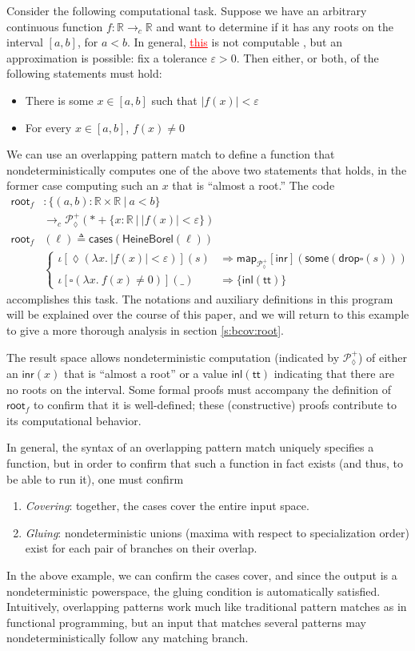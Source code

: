\documentclass[conference]{IEEEtran}
\newcommand{\PLower}{\mathcal{P}_\lozenge}
\newcommand{\cto}{\to_c}
\newcommand{\R}{\mathbb{R}}
\newcommand{\map}[2]{\mathsf{map}_{#1}[{#2}]}
\newcommand{\fun}[2]{\lambda {#1}.\  {#2}}
\newcommand{\suchthat}{\ |\ }
\newcommand{\One}{\ast}
\newcommand{\wildcard}{\_}
\newcommand{\oinclf}[1]{\iota[{#1}]}
\newcommand{\oincl}[2]{\oinclf{#1} \left({#2}\right)}
\newcommand{\Branch}{\Rightarrow}
\newcommand{\RootFindingCode}{
\mathsf{root}_f &: \{ (a, b) : \R \times \R \suchthat a < b \}
  \\ &\cto \PLower^+(\One + \{ x : \R \suchthat |f(x)| < \varepsilon \})
\\ \mathsf{root}_f&(\ell) \triangleq \mathsf{cases}(\mathsf{HeineBorel}(\ell))
\\ &\begin{cases}
\oincl{\lozenge (\fun{x}{|f(x)| < \varepsilon})}{s} 
  &\Branch \map{\PLower^+}{\mathsf{inr}}(\mathsf{some}(\mathsf{drop}\square(s)))
\\ \oincl{\square (\fun{x}{f(x) \neq 0})}{\wildcard}
  &\Branch \{ \mathsf{inl}(\mathsf{tt}) \}
\end{cases}
}
\newcommand{\grammar}[1]{\textcolor{red}{\underline{#1}}}
\begin{document}
Consider the following computational task. Suppose we have an arbitrary continuous function $f : \R \cto \R$ and want to determine if it has any roots on the interval $[a,b]$, for $a < b$. In general, \grammar{this} is not computable \cite{lamcra}, but an approximation is possible: fix a tolerance $\varepsilon > 0$. Then either, or both, of the following statements must hold:
\begin{itemize}
\item There is some $x \in [a, b]$ such that $|f(x)| < \varepsilon$
\item For every $x \in [a, b]$, $f(x) \neq 0$
\end{itemize}
We can use an overlapping pattern match to define a function that nondeterministically computes one of the above two statements that holds, in the former case computing such an $x$ that is ``almost a root.'' The code
\begin{align*}
\RootFindingCode
\end{align*}
accomplishes this task. The notations and auxiliary definitions in this program will be explained over the course of this paper, and we will return to this example to give a more thorough analysis in section \ref{s:bcov:root}.

The result space allows nondeterministic computation (indicated by $\PLower^+$) of either an $\mathsf{inr}(x)$ that is ``almost a root'' or a value $\mathsf{inl}(\mathsf{tt})$ indicating that there are no roots on the interval. Some formal proofs must accompany the definition of $\mathsf{root}_f$ to confirm that it is well-defined; these (constructive) proofs contribute to its computational behavior.
 
In general, the syntax of an overlapping pattern match uniquely specifies a function, but in order to confirm that such a function in fact exists (and thus, to be able to run it), one must confirm
\begin{enumerate}
\item \emph{Covering}: together, the cases cover the entire input space.
\item \emph{Gluing}: nondeterministic unions (maxima with respect to specialization order) exist for each pair of branches on their overlap.
\end{enumerate}
In the above example, we can confirm the cases cover, and since the output is a nondeterministic powerspace, the gluing condition is automatically satisfied. Intuitively, overlapping patterns work much like traditional pattern matches as in functional programming, but an input that matches several patterns may nondeterministically follow any matching branch.
\end{document}
